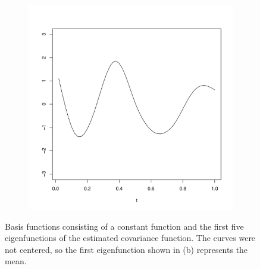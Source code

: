 \begin{figure}
	\begin{subfigure}
		[b]{0.32 
		\textwidth} \centering 
		\includegraphics[width=0.99 
		\textwidth]{Images-future-work/ef5.pdf} \caption{} \label{} 
	\end{subfigure}
	\caption{Basis functions consisting of a constant function and the first five eigenfunctions of the estimated covariance function. The curves were not centered, so the first eigenfunction shown in (b) represents the mean.} \label{fig:basis functions} 
\end{figure}
